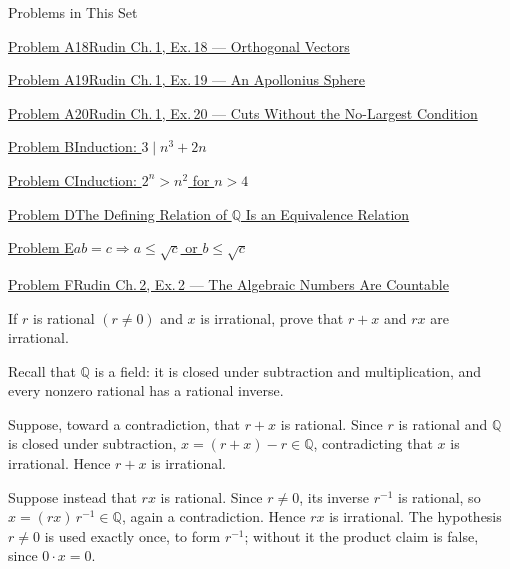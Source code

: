 \documentclass[main.tex]{subfiles}
\begin{document}
\begin{lecturecontents}{Problems in This Set}
  \item \hyperlink{prob:A18}{Problem A18\quad Rudin Ch.\,1, Ex.\,18 --- Orthogonal Vectors}
  \item \hyperlink{prob:A19}{Problem A19\quad Rudin Ch.\,1, Ex.\,19 --- An Apollonius Sphere}
  \item \hyperlink{prob:A20}{Problem A20\quad Rudin Ch.\,1, Ex.\,20 --- Cuts Without the No-Largest Condition}
  \item \hyperlink{prob:B}{Problem B\quad Induction: $3\mid n^3+2n$}
  \item \hyperlink{prob:C}{Problem C\quad Induction: $2^n>n^2$ for $n>4$}
  \item \hyperlink{prob:D}{Problem D\quad The Defining Relation of $\mathbb Q$ Is an Equivalence Relation}
  \item \hyperlink{prob:E}{Problem E\quad $ab=c\Rightarrow a\le\sqrt c$ or $b\le\sqrt c$}
  \item \hyperlink{prob:F}{Problem F\quad Rudin Ch.\,2, Ex.\,2 --- The Algebraic Numbers Are Countable}
\end{lecturecontents}

If $r$ is rational $(r\neq 0)$ and $x$ is irrational, prove that $r+x$ and $rx$ are irrational.

\begin{Solution}
Recall that $\mathbb Q$ is a field: it is closed under subtraction and multiplication, and every
nonzero rational has a rational inverse.

Suppose, toward a contradiction, that $r+x$ is rational. Since $r$ is rational and $\mathbb Q$ is
closed under subtraction, $x=(r+x)-r\in\mathbb Q$, contradicting that $x$ is irrational. Hence $r+x$
is irrational.

Suppose instead that $rx$ is rational. Since $r\neq 0$, its inverse $r^{-1}$ is rational, so
$x=(rx)\,r^{-1}\in\mathbb Q$, again a contradiction. Hence $rx$ is irrational. The hypothesis $r\neq 0$
is used exactly once, to form $r^{-1}$; without it the product claim is false, since $0\cdot x=0$.
\end{Solution}
\end{document}
